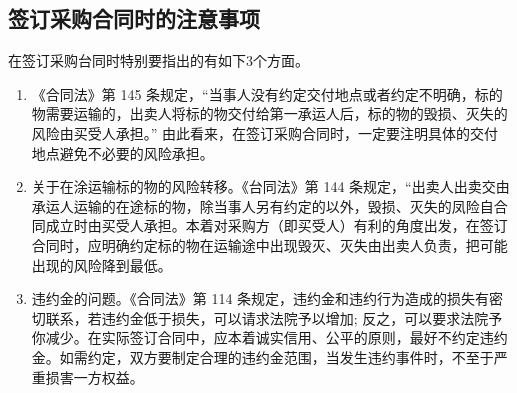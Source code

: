 \subsection {签订采购合同时的注意事项}

    在签订采购台同时特别要指出的有如下3个方面。

    \begin{enumerate}
        \item 《合同法》第 145 条规定，“当事人没有约定交付地点或者约定不明确，标的物需要运输的，出卖人将标的物交付给第一承运人后，标的物的毁损、灭失的风险由买受人承担。” 由此看来，在签订采购合同时，一定要注明具体的交付地点避免不必要的风险承担。

        \item 关于在涂运输标的物的风险转移。《台同法》第 144 条规定，“出卖人出卖交由承运人运输的在途标的物，除当事人另有约定的以外，毁损、灭失的凤险自合同成立时由买受人承担。本着对采购方（即买受人）有利的角度出发，在签订合同时，应明确约定标的物在运输途中出现毁灭、灭失由出卖人负责，把可能出现的风险降到最低。

        \item 违约金的问题。《合同法》第 114 条规定，违约金和违约行为造成的损失有密切联系，若违约金低于损失，可以请求法院予以增加; 反之，可以要求法院予你减少。在实际签订合同中，应本着诚实信用、公平的原则，最好不约定违约金。如需约定，双方要制定合理的违约金范围，当发生违约事件时，不至于严重损害一方权益。
   \end{enumerate}
